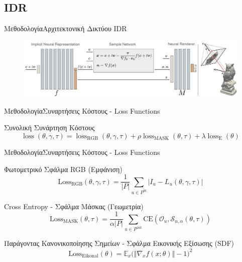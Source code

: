 \documentclass[10pt]{beamer}
\begin{document}
\subsection{IDR}


\begin{frame}{Mεθοδολογία}{Αρχιτεκτονική Δικτύου IDR}
\begin{figure}
    \centering
    \includegraphics[width=\textwidth]{images/idr-network-architecture.png}
\end{figure}

\end{frame}
\begin{frame}{Μεθοδολογία}{Συναρτήσεις Κόστους - Loss Functions}
    \begin{block}{Συνολική Συνάρτηση Κόστους}
    $$
    \operatorname{loss}(\theta, \gamma, \tau) = \operatorname{loss}_{\mathrm{RGB}}(\theta, \gamma, \tau) + \rho \operatorname{loss}_{\mathrm{MASK}}(\theta, \tau) + \lambda \operatorname{loss}_{\mathrm{E}}(\theta) $$
\end{block}
    
\end{frame}
\begin{frame}{Μεθοδολογία}{Συναρτήσεις Κόστους - Loss Functions}
\begin{block}{Φωτομετρικό Σφάλμα RGB (Εμφάνιση)}
    \[\mathrm{Loss}_{\mathrm{RGB}}(\theta,\gamma,\tau)=\frac{1}{|P|}\sum_{u\in P^{\mathrm{in}}}|I_{u}-L_{u}(\theta,\gamma,\tau)|\]
\end{block}
\begin{block}{Cross Entropy - Σφάλμα Μάσκας (Γεωμετρία)}
        \[\mathrm{Loss}_{\text{MASK}}(\theta,\tau)=\frac{1}{\alpha|P|}\sum_{u\in P^{\text{out}}}\mathrm{CE}(\mathcal{O}_u,\mathcal{S}_{u,\alpha}(\theta,\tau)) \]
\end{block}
\begin{block}{Παράγοντας Κανονικοποίησης Σημείων - Σφάλμα Εικονικής Εξίσωσης (SDF)}
    \[{{\mathrm{Loss}_{\mathrm{Eikonal}}(\theta)=\mathbb{E}_{x}{\Big(}\Vert\nabla_{x}f(x;\theta)\Vert-1\Big)^{2}}}\]
\end{block}
\end{frame}
\end{document}
